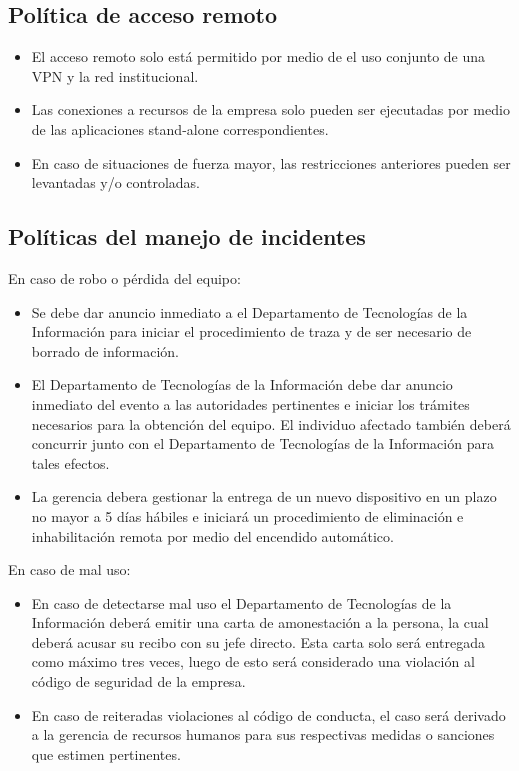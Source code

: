 \subsection{Política de acceso remoto}
\begin{itemize}
    \item El acceso remoto solo está permitido por medio de el uso conjunto de una VPN y la red institucional.
    \item Las conexiones a recursos de la empresa solo pueden ser ejecutadas por medio de las aplicaciones stand-alone correspondientes.
    \item En caso de situaciones de fuerza mayor, las restricciones anteriores pueden ser levantadas y/o controladas.
\end{itemize}

\subsection{Políticas del manejo de incidentes}
En caso de robo o pérdida del equipo:
\begin{itemize}
    \item Se debe dar anuncio inmediato a el Departamento de Tecnologías de la Información para iniciar el procedimiento de traza y de ser necesario de borrado de información.
    \item El Departamento de Tecnologías de la Información debe dar anuncio inmediato del evento a las autoridades pertinentes e iniciar los trámites necesarios para la obtención del equipo. El individuo afectado también deberá concurrir junto con el Departamento de Tecnologías de la Información para tales efectos.
    \item La gerencia debera gestionar la entrega de un nuevo dispositivo en un plazo no mayor a 5 días hábiles e iniciará un procedimiento de eliminación e inhabilitación remota por medio del encendido automático.
\end{itemize}

En caso de mal uso:
\begin{itemize}
    \item En caso de detectarse mal uso el Departamento de Tecnologías de la Información deberá emitir una carta de amonestación a la persona, la cual deberá acusar su recibo con su jefe directo. Esta carta solo será entregada como máximo tres veces, luego de esto será considerado una violación al código de seguridad de la empresa.
    \item En caso de reiteradas violaciones al código de conducta, el caso será derivado a la gerencia de recursos humanos para sus respectivas medidas o sanciones que estimen pertinentes.
\end{itemize}

